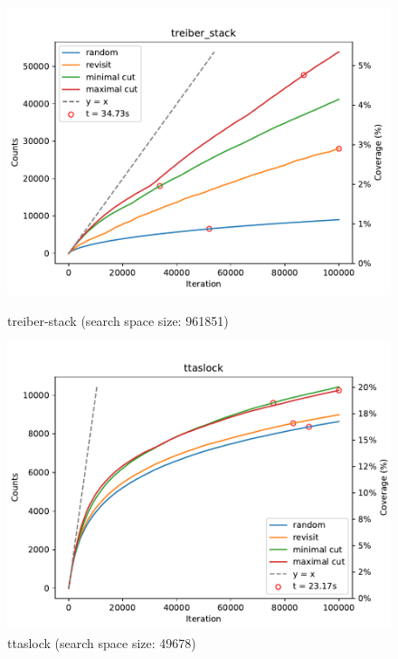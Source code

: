 \begin{figure}[h!]
	\begin{minipage}{0.45\textwidth}
		\centering
		\includegraphics[width=\textwidth]{figure/genmc/treiber_stack.pdf}
		\caption{treiber-stack (search space size: 961851)}
		\label{genmc:treiber_stack}
	\end{minipage}
	\hfill
	\begin{minipage}{0.45\textwidth}
		\centering
		\includegraphics[width=\textwidth]{figure/genmc/ttaslock.pdf}
		\caption{ttaslock (search space size: 49678)}
		\label{genmc:ttaslock}
	\end{minipage}

\end{figure}




